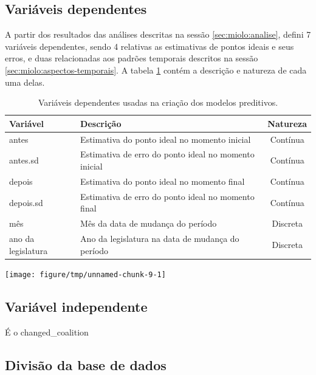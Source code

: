 \documentclass[a4paper,titlepage]{ppgi}\usepackage[]{graphicx}\usepackage[]{color}
\newenvironment{knitrout}{}{} %
\begin{document}
\subsection{Variáveis dependentes}

A partir dos resultados das análises descritas na sessão
\ref{sec:miolo:analise}, defini 7 variáveis dependentes, sendo 4 relativas
as estimativas de pontos ideais e seus erros, e duas relacionadas aos padrões
temporais descritos na sessão \ref{sec:miolo:aspectos-temporais}. A tabela
\ref{table:variaveis-dependentes} contém a descrição e natureza de cada uma
delas.

\begin{table}
\centering
\begin{tabular}{l l c}
  Variável & Descrição & Natureza \\
  \hline
  antes & Estimativa do ponto ideal no momento inicial & Contínua \\
  antes.sd & Estimativa de erro do ponto ideal no momento inicial& Contínua \\
  depois & Estimativa do ponto ideal no momento final & Contínua \\
  depois.sd & Estimativa de erro do ponto ideal no momento final & Contínua \\
  mês & Mês da data de mudança do período & Discreta \\
  ano da legislatura & Ano da legislatura na data de mudança do período & Discreta \\
\end{tabular}
\caption{Variáveis dependentes usadas na criação dos modelos preditivos.}
\label{table:variaveis-dependentes}
\end{table}

\begin{knitrout}
\color{fgcolor}
\texttt{[image: figure/tmp/unnamed-chunk-9-1]} 

\end{knitrout}

\subsection{Variável independente}

É o changed\_coalition

\subsection{Divisão da base de dados}
\end{document}
